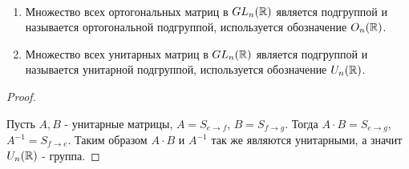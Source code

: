 \begin{corollary}~
    \begin{enumerate}
        \item
        Множество всех ортогональных матриц в $GL_n(\mathbb{R})$ является подгруппой и называется ортогональной
        подгруппой, используется обозначение $O_n(\mathbb{R})$.
        \item Множество всех унитарных матриц в $GL_n(\mathbb{R})$ является подгруппой и называется 
        унитарной подгруппой, используется обозначение $U_n(\mathbb{R})$.
    \end{enumerate}
\end{corollary}

\begin{proof}~

    Пусть $A, B$ - унитарные матрицы, $A = S_{e \to f}$, $B = S_{f \to g}$.
    Тогда $A \cdot B = S_{e \to g}$, $A^{-1} = S_{f \to e}$. Таким образом $A\cdot B$ и $A^{-1}$ 
    так же являются унитарными, а значит $U_n(\mathbb{R})$ - группа.
\end{proof}